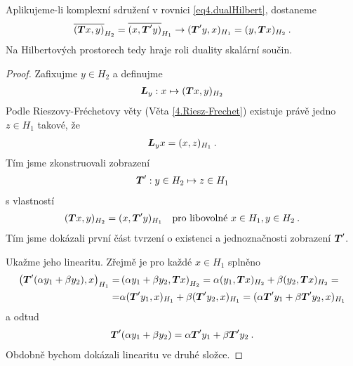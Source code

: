 \begin{remark}
Aplikujeme-li komplexní sdružení v rovnici \eqref{eq4.dualHilbert}, dostaneme \begin{align*}
    \overline{(\boldsymbol{T} x,y)}_{H_2} = \overline{(x, \boldsymbol{T}' y)}_{H_1} \rightarrow (\boldsymbol{T}' y,x)_{H_1} = (y, \boldsymbol{T} x)_{H_2} \:.
\end{align*}
Na Hilbertových prostorech tedy hraje roli duality skalární součin.
\end{remark}
\begin{proof}
Zafixujme $y \in H_2$ a definujme \begin{align*}
    \boldsymbol{L}_y : x \mapsto (\boldsymbol{T} x,y)_{H_2}
\end{align*}
Podle Rieszovy-Fréchetovy věty (Věta \ref{4.Riesz-Frechet}) existuje právě jedno $z \in H_1$ takové, že \begin{align*}
    \boldsymbol{L}_y x = (x,z)_{H_1} \:.
\end{align*}
Tím jsme zkonstruovali zobrazení \begin{align*}
    \boldsymbol{T}' : y \in H_2 \mapsto z \in H_1
\end{align*}
s vlastností \begin{align*}
    (\boldsymbol{T} x, y)_{H_2} = (x,\boldsymbol{T}' y)_{H_1} \quad \text{pro libovolné } x\in H_1, y \in H_2 \:.
\end{align*}
Tím jsme dokázali první část tvrzení o existenci a jednoznačnosti zobrazení $\boldsymbol{T}'$.

Ukažme jeho linearitu. Zřejmě je pro každé $x \in H_1$ splněno \begin{align*}
    \left( \boldsymbol{T}' (\alpha y_1 + \beta y_2) , x \right)_{H_1} =& \left( \alpha y_1 + \beta y_2 , \boldsymbol{T} x \right)_{H_2} = \alpha (y_1, \boldsymbol{T} x)_{H_2} + \beta (y_2, \boldsymbol{T} x)_{H_2} = \\
    =&
    \alpha (\boldsymbol{T}' y_1, x)_{H_1} + \beta (\boldsymbol{T}' y_2, x)_{H_1} = (\alpha \boldsymbol{T}' y_1 + \beta \boldsymbol{T}' y_2, x)_{H_1}
\end{align*} a odtud \begin{align*}
    \boldsymbol{T}' (\alpha y_1 + \beta y_2) = \alpha \boldsymbol{T}' y_1 + \beta \boldsymbol{T}' y_2 \:.
\end{align*}
Obdobně bychom dokázali linearitu ve druhé složce.


\end{proof}
